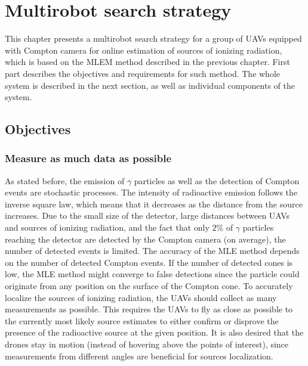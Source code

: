 
\chapter{Multirobot search strategy}

This chapter presents a multirobot search strategy for a group of \ac{UAV}s equipped with Compton camera for online estimation of sources of ionizing radiation, which is based on the \ac{MLEM} method described in the previous chapter.
First part describes the objectives and requirements for such method.
The whole system is described in the next section, as well as individual components of the system.
\section{Objectives}

\subsection{Measure as much data as possible}
As stated before, the emission of $\gamma$ particles as well as the detection of Compton events are stochastic processes.
The intensity of radioactive emission follows the inverse square law, which means that it decreases as the distance from the source increases.
Due to the small size of the detector, large distances between \ac{UAV}s and sources of ionizing radiation, and the fact that only $2\%$ of $\gamma$ particles reaching the detector are detected by the Compton camera (on average), the number of detected events is limited.
The accuracy of the \ac{MLE} method depends on the number of detected Compton events.
If the number of detected cones is low, the \ac{MLE} method might converge to false detections since the particle could originate from any position on the surface of the Compton cone.
To accurately localize the sources of ionizing radiation, the \ac{UAV}s should collect as many measurements as possible.
This requires the \ac{UAV}s to fly as close as possible to the currently most likely source estimates to either confirm or disprove the presence of the radioactive source at the given position.
It is also desired that the drones stay in motion (instead of hovering above the points of interest), since measurements from different angles are beneficial for sources localization.

